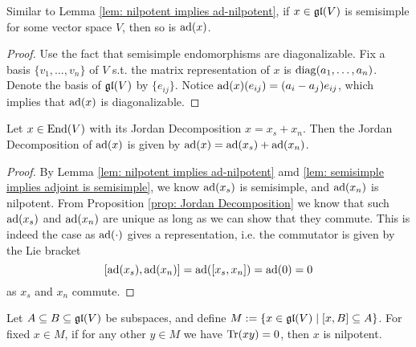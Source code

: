 \documentclass{article}
\begin{document}
\begin{lemma}\label{lem: semisimple implies adjoint is semisimple}
    Similar to Lemma \ref{lem: nilpotent implies ad-nilpotent}, if $x \in \mathfrak{gl}(V)$ is semisimple for some vector space $V$, then so is $\operatorname{ad}(x)$.
\end{lemma}

\begin{proof}
    Use the fact that semisimple endomorphisms are diagonalizable. Fix a basis $\{ v_1, \dots, v_n \}$ of $V$ s.t. the matrix representation of $x$ is $\operatorname{diag}( a_1, \dots, a_n )$. Denote the basis of $\mathfrak{gl}(V)$ by $\{ e_{ij} \}$. Notice $\operatorname{ad}(x)(e_{ij}) = (a_i - a_j) e_{ij}$, which implies that $\operatorname{ad}(x)$ is diagonalizable.
\end{proof}

\begin{proposition}\label{prop: Jordan Decomposition of ad}
    Let $x \in \mathrm{End}(V)$ with its Jordan Decomposition $x = x_s + x_n$. Then the Jordan Decomposition of $\operatorname{ad}(x)$ is given by $\operatorname{ad}(x) = \operatorname{ad}(x_s) + \operatorname{ad}(x_n)$.
\end{proposition}

\begin{proof}
    By Lemma \ref{lem: nilpotent implies ad-nilpotent} amd \ref{lem: semisimple implies adjoint is semisimple}, we know $\operatorname{ad}(x_s)$ is semisimple, and $\operatorname{ad}(x_n)$ is nilpotent. From Proposition \ref{prop: Jordan Decomposition} we know that such $\operatorname{ad}(x_s)$ and $\operatorname{ad}(x_n)$ are unique as long as we can show that they commute. This is indeed the case as $\operatorname{ad}(\cdot)$ gives a representation, i.e. the commutator is given by the Lie bracket
    \[
        [\operatorname{ad}(x_s), \operatorname{ad}(x_n)] = \operatorname{ad}([x_s, x_n]) = \operatorname{ad}(0) = 0    
    \]
    as $x_s$ and $x_n$ commute.
\end{proof}

\begin{lemma}\label{lem: prep for Cartan's 1st Criterion}
    Let $A \subseteq B \subseteq \mathfrak{gl}(V)$ be subspaces, and define $M := \{ x \in \mathfrak{gl}(V) \mid [x, B] \subseteq A \}$. For fixed $x \in M$, if for any other $y \in M$ we have $\operatorname{Tr}(xy) = 0$, then $x$ is nilpotent.
\end{lemma}
\end{document}
